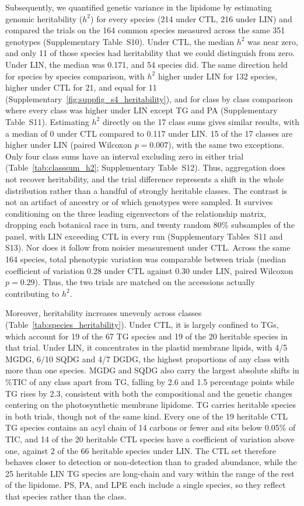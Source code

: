 \documentclass[9pt,twocolumn,twoside]{rilabRxiv}
\begin{document}
Subsequently, we quantified genetic variance in the lipidome by estimating genomic heritability ($h^2$) for every species (214 under CTL, 216 under LIN) and compared the trials on the 164 common species measured across the same 351 genotypes (Supplementary Table~S10). Under CTL, the median $h^2$ was near zero, and only 11 of those species had heritability that we could distinguish from zero. Under LIN, the median was 0.171, and 54 species did. The same direction held for species by species comparison, with $h^2$ higher under LIN for 132 species, higher under CTL for 21, and equal for 11 (Supplementary~\ref{fig:suppfig_s4_heritability}), and for class by class comparison where every class was higher under LIN except TG and PA (Supplementary Table~S11). Estimating $h^2$ directly on the 17 class sums gives similar results, with a median of 0 under CTL compared to 0.117 under LIN. 15 of the 17 classes are higher under LIN (paired Wilcoxon $p=0.007$), with the same two exceptions. Only four class sums have an interval excluding zero in either trial (Table~\ref{tab:classsum_h2}; Supplementary Table~S12). Thus, aggregation does not recover heritability, and the trial difference represents a shift in the whole distribution rather than a handful of strongly heritable classes. The contrast is not an artifact of ancestry or of which genotypes were sampled. It survives conditioning on the three leading eigenvectors of the relationship matrix, dropping each botanical race in turn, and twenty random 80\% subsamples of the panel, with LIN exceeding CTL in every run (Supplementary Tables~S11 and S13). Nor does it follow from noisier measurement under CTL. Across the same 164 species, total phenotypic variation was comparable between trials (median coefficient of variation 0.28 under CTL against 0.30 under LIN, paired Wilcoxon $p=0.29$). Thus, the two trials are matched on the accessions actually contributing to $h^2$.

Moreover, heritability increases unevenly across classes (Table~\ref{tab:species_heritability}). Under CTL, it is largely confined to TGs, which account for 19 of the 67 TG species and 19 of the 20 heritable species in that trial. Under LIN, it concentrates in the plastid membrane lipids, with 4/5 MGDG, 6/10 SQDG and 4/7 DGDG, the highest proportions of any class with more than one species. MGDG and SQDG also carry the largest absolute shifts in \%TIC of any class apart from TG, falling by 2.6 and 1.5 percentage points while TG rises by 2.3, consistent with both the compositional and the genetic changes centering on the photosynthetic membrane lipidome. TG carries heritable species in both trials, though not of the same kind. Every one of the 19 heritable CTL TG species contains an acyl chain of 14 carbons or fewer and sits below 0.05\% of TIC, and 14 of the 20 heritable CTL species have a coefficient of variation above one, against 2 of the 66 heritable species under LIN. The CTL set therefore behaves closer to detection or non-detection than to graded abundance, while the 25 heritable LIN TG species are long-chain and vary within the range of the rest of the lipidome. PS, PA, and LPE each include a single species, so they reflect that species rather than the class.
\end{document}
